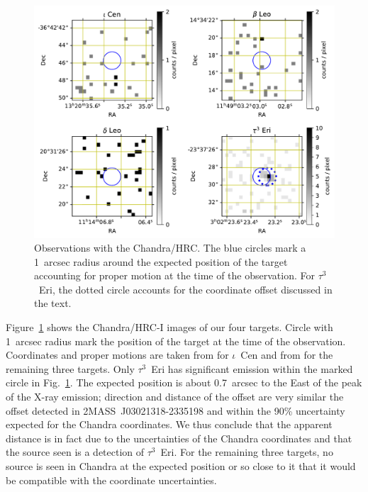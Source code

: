 \documentclass[preprint2]{aastex631}
\begin{document}
\begin{figure}
    \centering
    \includegraphics[width=\textwidth]{figures/chandra.pdf}
    \caption{Observations with the Chandra/HRC. The blue circles mark a 1~arcsec radius around the expected position of the target accounting for proper motion at the time of the observation. For $\tau^3$~Eri, the dotted circle accounts for the coordinate offset discussed in the text.
    \label{fig:chandra}}
\end{figure}

Figure~\ref{fig:chandra} shows the Chandra/HRC-I images of our four
targets. Circle with 1~arcsec radius mark the position of the
target at the time of the observation. Coordinates and proper motions
are taken from \citet{2018yCat.1345....0G} for $\iota$~Cen and from
\cite{2007A&A...474..653V} for the remaining three targets. Only
$\tau^3$~Eri has significant emission within the marked circle in
Fig.~\ref{fig:chandra}. The expected position is about 0.7~arcsec to
the East of the peak of the X-ray emission; direction and distance of
the offset are very similar the offset detected in
2MASS~J03021318-2335198 and within the 90\% uncertainty expected for
the Chandra coordinates. We thus conclude that the apparent distance
is in fact due to the uncertainties of the Chandra coordinates and
that the source seen is a detection of $\tau^3$~Eri. For the remaining
three targets, no source is seen in Chandra at the expected position
or so close to it that it would be compatible with the coordinate
uncertainties.
\end{document}
